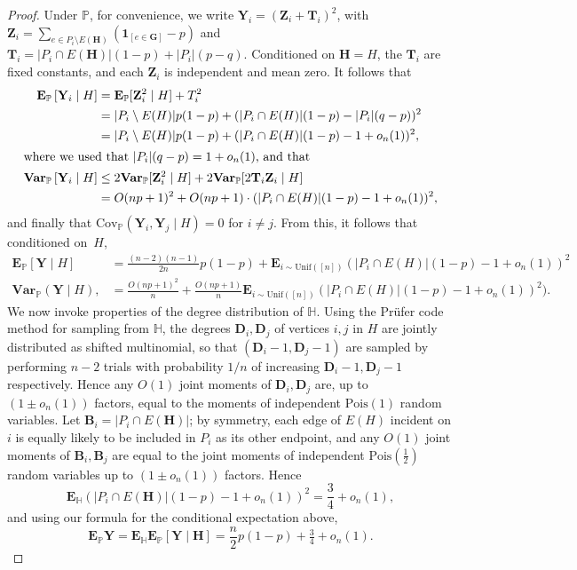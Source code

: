 \documentclass[11pt]{article}
\newcommand{\e}{{\mathbf E}}
\newcommand{\va}{{\mathbf{Var}}}
\newcommand{\Ind}[1]{{\mathbf 1}_{[#1]}}
\newcommand{\bB}{\mathbf{B}}
\newcommand{\bD}{\mathbf{D}}
\newcommand{\bG}{\mathbf{G}}
\newcommand{\bH}{\mathbf{H}}
\newcommand{\bT}{\mathbf{T}}
\newcommand{\bY}{\mathbf{Y}}
\newcommand{\bZ}{\mathbf{Z}}
\newcommand{\bbH}{\mathbb{H}}
\newcommand{\bbP}{\mathbb{P}}
\numberwithin{equation}{section}
\numberwithin{thm}{section}
\newcommand{\Pois}{\mathrm{Pois}}
\begin{document}
\begin{proof}
Under $\bbP$, for convenience, we write $\bY_i = (\bZ_i + \bT_i)^2$, with $\bZ_i = \sum_{e \in P_i \setminus E(\bH)} (\Ind{e \in \bG} - p)$ and $\bT_i = |P_i \cap E(\bH)|(1-p) + |P_i|(p-q)$. 
Conditioned on $\bH = H$, the $\bT_i$ are fixed constants, and each $\bZ_i$ is independent and mean zero.
It follows that
\begin{align*}
\e_{\bbP} \left[ \bY_i \mid H\right] 
&= \e_{\bbP}[\bZ_i^2\mid H] + T_i^2\\
&= |P_i\setminus E(H)|p(1-p) + (|P_i \cap E(H)|(1-p)- |P_i|(q-p))^2\\
&= |P_i \setminus E(H)|p(1-p) + (|P_i \cap E(H)|(1-p) - 1 + o_n(1))^2,\\
\intertext{where we used that $|P_i|(q-p) = 1 + o_{n}(1)$, and that}
\va_{\bbP}\left[\bY_i \mid H\right]
&\le 2\va_{\bbP} [\bZ_i^2 \mid H] + 2 \va_{\bbP} [2\bT_i\bZ_i \mid H]\\
&= O(np+1)^2 + O(np + 1)\cdot (|P_i \cap E(H)|(1-p) - 1 + o_n(1))^2,
\end{align*}
and finally that 
$\mathrm{Cov}_\bbP(\bY_i,\bY_j \mid H) = 0$ for $i \neq j$. 
From this, it follows that conditioned on~$H$,
\begin{align*}
\e_{\bbP}[\bY \mid H]
&= \frac{(n-2)(n-1)}{2n}p(1-p) + \e_{i \sim \mathrm{Unif}([n])}(|P_i \cap E(H)|(1-p) - 1 + o_n(1))^2\\
\va_{\bbP}(\bY \mid H),
&= \frac{O(np+1)^2}{n} +\frac{O(np+1)}{n}\e_{i \sim \mathrm{Unif}([n])}(|P_i \cap E(H)|(1-p) - 1 + o_n(1))^2).
\end{align*}
We now invoke properties of the degree distribution of $\bbH$. 
Using the Pr\"{u}fer code method for sampling from $\bbH$, the degrees $\bD_i,\bD_j$ of vertices $i,j$ in $H$ are jointly distributed as shifted multinomial, so that $(\bD_i -1,\bD_j - 1)$ are sampled by performing $n-2$ trials with probability $1/n$ of increasing $\bD_i-1,\bD_j-1$ respectively.
Hence any $O(1)$ joint moments of $\bD_i,\bD_j$ are, up to $(1\pm o_n(1))$ factors, equal to the moments of independent $\Pois(1)$ random variables.
Let $\bB_i = |P_i \cap E(\bH)|$; by symmetry, each edge of $E(H)$ incident on $i$ is equally likely to be included in $P_i$ as its other endpoint, and any $O(1)$ joint moments of $\bB_i,\bB_j$ are equal to the joint moments of independent $\Pois(\frac{1}{2})$ random variables up to $(1\pm o_n(1))$ factors.
Hence 
\[
\e_{\bbH} (|P_i \cap E(\bH)|(1-p) - 1 + o_n(1))^2 = \frac{3}{4} + o_n(1),
\]
and using our formula for the conditional expectation above,
\[
\e_{\bbP}\bY = \e_{\bbH}\e_{\bbP}[\bY \mid \bH] = \frac{n}{2}p(1-p) + \tfrac{3}{4} +o_n(1).
\]
\end{proof}
\end{document}
